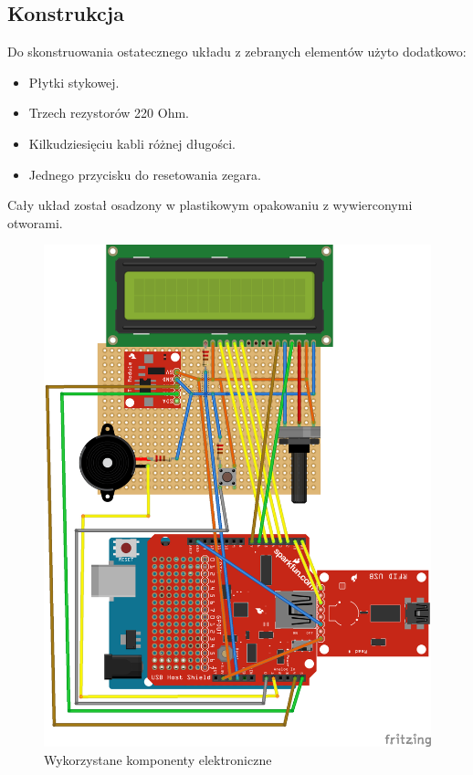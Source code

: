 \documentclass[declaration,shortabstract, mgr]{iithesis}
\begin{document}
\subsection{Konstrukcja}
\indent Do skonstruowania ostatecznego układu z zebranych elementów użyto dodatkowo:
\begin{itemize}
\item Płytki stykowej.
\item Trzech rezystorów 220 Ohm.
\item Kilkudziesięciu kabli różnej długości.
\item Jednego przycisku do resetowania zegara.
\end{itemize}
\indent Cały układ został osadzony w plastikowym opakowaniu z wywierconymi otworami.\\
\begin{figure}[h]
\caption{Wykorzystane komponenty elektroniczne}
\centering
\includegraphics{circuit.png}
\end{figure}
\end{document}

